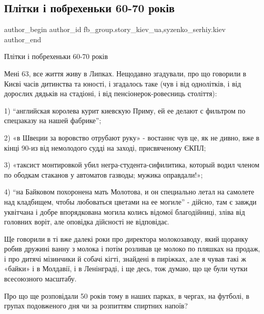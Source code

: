  
 
 
 
 
 
\subsection{Плітки і побрехеньки 60-70 років}
\label{sec:29_01_2022.fb.fb_group.story_kiev_ua.1.plitky_pobrehenki_60_70_rokiv}
 
\ifcmt
 author_begin
   author_id fb_group.story_kiev_ua,syzenko_serhiy.kiev
 author_end
\fi

Плітки і побрехеньки 60-70 років

Мені 63, все життя живу в Липках. Нещодавно згадували, про що говорили в Києві
часів дитинства та юності, і згадалось таке (чув і від однолітків, і від
дорослих дядьків на стадіоні, і від пенсіонерок-ровесниць століття):

1) \enquote{английская королева курит киевскую Приму, ей ее делают с фильтром по
спецзаказу на нашей фабрике};

2) «в Швеции за воровство отрубают руку» - востаннє чув це, як не дивно, вже в
кінці 90-из від немолодого судді на заході, присвяченому ЄКПЛ;

3) «таксист монтировкой убил негра-студента-сифилитика, который водил членом по
ободкам стаканов у автоматов газводы; мужика оправдали!»;

4) \enquote{на Байковом похоронена мать Молотова, и он специально летал на самолете над
кладбищем, чтобы любоваться цветами на ее могиле} - дійсно, там є завжди
уквітчана і добре впорядкована могила колись відомої благодійниці, зліва від
головних воріт, але оповідка дійсності не відповідає.

Ще говорили в ті вже далекі роки про директора молокозаводу, який щоранку робив
дружині ванну з молока і потім розливав це молоко по пляшках на продаж, і про
дитячі мізинчики й собачі кігті, знайдені в пиріжках, але я чував такі ж
«байки» і в Молдавії, і в Ленінграді, і ще десь, тож думаю, що це були чутки
всесоюзного масштабу.

Про що ще розповідали 50 років тому в наших парках, в чергах, на футболі, в
групах подовженого дня чи за розпиттям спиртних напоїв?

